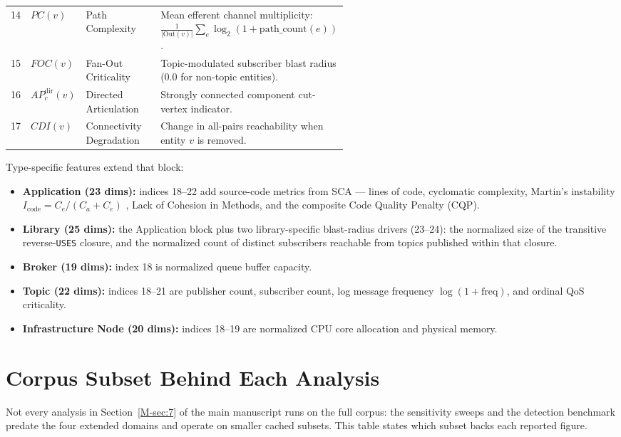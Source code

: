 \documentclass[preprint,3p]{elsarticle}
\begin{document}
\begin{table}[htbp]
{\begin{tabular}{cllp{0.55\linewidth}}
14 & $PC(v)$ & Path Complexity & Mean efferent channel multiplicity: $\frac{1}{|\text{Out}(v)|}\sum_{e} \log_2(1 + \text{path\_count}(e))$. \\
15 & $FOC(v)$ & Fan-Out Criticality & Topic-modulated subscriber blast radius ($0.0$ for non-topic entities). \\
16 & $AP_c^{\text{dir}}(v)$ & Directed Articulation & Strongly connected component cut-vertex indicator. \\
17 & $CDI(v)$ & Connectivity Degradation & Change in all-pairs reachability when entity $v$ is removed. \\
\bottomrule
\end{tabular}%
}
\end{table}

Type-specific features extend that block:
\begin{itemize}
    \item \textbf{Application (23 dims):} indices 18--22 add source-code metrics from SCA --- lines of code, cyclomatic complexity, Martin's instability $I_{\text{code}} = C_e/(C_a + C_e)$ \cite{martin2003agile}, Lack of Cohesion in Methods, and the composite Code Quality Penalty (CQP).
    \item \textbf{Library (25 dims):} the Application block plus two library-specific blast-radius drivers (23--24): the normalized size of the transitive reverse-\texttt{USES} closure, and the normalized count of distinct subscribers reachable from topics published within that closure.
    \item \textbf{Broker (19 dims):} index 18 is normalized queue buffer capacity.
    \item \textbf{Topic (22 dims):} indices 18--21 are publisher count, subscriber count, log message frequency $\log(1 + \text{freq})$, and ordinal QoS criticality.
    \item \textbf{Infrastructure Node (20 dims):} indices 18--19 are normalized CPU core allocation and physical memory.
\end{itemize}

\section{Corpus Subset Behind Each Analysis}
\label{supp:corpusmap}

Not every analysis in Section~\ref{M-sec:7} of the main manuscript runs on the full corpus: the sensitivity sweeps and the detection benchmark predate the four extended domains and operate on smaller cached subsets. This table states which subset backs each reported figure.
\end{document}
